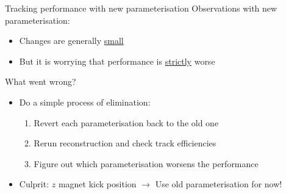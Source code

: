 \documentclass[xcolor={dvipsnames}]{beamer}
\begin{document}
\begin{frame}{Tracking performance with new parameterisation}
  \vspace{0.0cm}
  {\Large Observations with new parameterisation:}
  \vspace{0.3cm}
  \begin{itemize}
    \setlength\itemsep{1.0em}
    \item{Changes are generally \underline{small}}
    \item{But it is worrying that performance is \underline{strictly} worse}
  \end{itemize}
  \vspace{0.6cm}
  {\Large What went wrong?}
  \vspace{0.3cm}
  \begin{itemize}
    \setlength\itemsep{1.0em}
    \item{Do a simple process of elimination:}
    \begin{enumerate}
      \item{Revert each parameterisation back to the old one}
      \item{Rerun reconstruction and check track efficiencies}
      \item{Figure out which parameterisation worsens the performance}
    \end{enumerate}
    \item{Culprit: $z$ magnet kick position $\to$ Use old parameterisation for now!}
  \end{itemize}
\end{frame}
\end{document}
